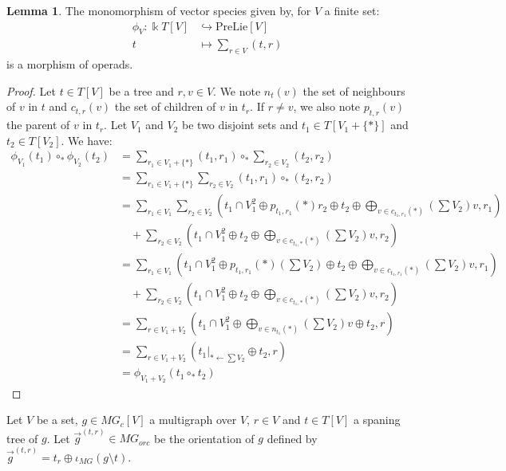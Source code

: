 \documentclass[a4paper]{article}
\theoremstyle{definition}
\newtheorem{lemma}[definition]{Lemma}
\begin{document}
\begin{lemma}
\label{prelie}
The monomorphism of vector species given by, for $V$ a finite set: 
\begin{align*}
\phi_V: \Bbbk T[V] &\hookrightarrow \text{PreLie}[V] \\
t &\mapsto \sum_{r\in V} (t,r)
\end{align*}
is a morphism of operads.
\end{lemma}

\begin{proof}
Let $t\in T[V]$ be a tree and $r,v\in V$. We note $n_t(v)$ the set of neighbours of $v$ in $t$ and $c_{t,r}(v)$ the set of children of $v$ in $t_r$. If $r\not = v$, we also note $p_{t,r}(v)$ the parent of $v$ in $t_r$. Let $V_1$ and $V_2$ be two disjoint sets and $t_1\in T[V_1+\{\ast\}]$ and $t_2\in T[V_2]$. We have:
\begin{align*}
\phi_{V_1}(t_1)\circ_{\ast} \phi_{V_2}(t_2) &= \sum_{r_1\in V_1+\{\ast\}} (t_1,r_1) \circ_{\ast} \sum_{r_2\in V_2}(t_2,r_2) \\
&= \sum_{r_1\in V_1+\{\ast\}}\sum_{r_2\in V_2} (t_1,r_1)\circ_{\ast} (t_2,r_2) \\ 
&= \sum_{r_1\in V_1}\sum_{r_2\in V_2} \left(t_1\cap V_1^2\oplus p_{t_1,r_1}(\ast)r_2\oplus t_2 \oplus \bigoplus_{v\in c_{t_1,r_1}(\ast)} \left(\sum V_2\right)v, r_1\right) \\
&\quad + \sum_{r_2\in V_2}\left(t_1\cap V_1^2\oplus t_2 \oplus \bigoplus_{v\in c_{t_1,\ast}(\ast)} \left(\sum V_2\right)v,r_2\right) \\
&= \sum_{r_1\in V_1} \left(t_1\cap V_1^2\oplus p_{t_1,r_1}(\ast)\left(\sum V_2\right) \oplus t_2 \oplus \bigoplus_{v\in c_{t_1,r_1}(\ast)} \left(\sum V_2\right)v, r_1\right) \\
&\quad+ \sum_{r_2\in V_2} \left(t_1\cap V_1^2\oplus t_2 \oplus \bigoplus_{v\in c_{t_1,\ast}(\ast)} \left(\sum V_2\right)v,r_2\right) \\
&= \sum_{r\in V_1+V_2}\left(t_1\cap V_1^2\oplus\bigoplus_{v\in n_{t_1}(\ast)}\left(\sum V_2\right)v\oplus t_2,r\right) \\
&= \sum_{r\in V_1+V_2} \left(t_1|_{\ast \leftarrow \sum V_2}\oplus t_2,r\right) \\
&= \phi_{V_1+V_2}(t_1\circ_{\ast} t_2)
\end{align*}
\end{proof}

Let $V$ be a set, $g\in MG_c[V]$ a multigraph over $V$, $r\in V$ and $t\in T[V]$ a spaning tree of $g$. Let $\overrightarrow{g}^{(t,r)}\in MG_{orc}$ be the orientation of $g$ defined by $\overrightarrow{g}^{(t,r)}=t_{r}\oplus\iota_{MG}(g\setminus t)$.
\end{document}
